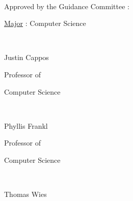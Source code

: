 \thispagestyle{plain}
\mbox{} \\
{\large
Approved by the Guidance Committee :

\vspace{.2 in}

\hspace{.2 in} \underline{Major} : Computer Science

\vspace{.2 in plus 1fill}

\hspace{3.2 in} \hrulefill\

\vspace{-.2 in}

\hspace{3.2 in} Justin Cappos
\vspace{-.1 in}

\hspace{3.2 in} Professor of

\vspace{-.2 in}

\hspace{3.2 in} Computer Science

\vspace{.2 in plus 1fill}




\hspace{3.2 in} \hrulefill\

\vspace{-.2 in}

\hspace{3.2 in} Phyllis Frankl
\vspace{-.1 in}

\hspace{3.2 in} Professor of

\vspace{-.2 in}

\hspace{3.2 in} Computer Science

\vspace{.2 in plus 1fill}

\hspace{3.2 in} \hrulefill\

\vspace{-.2 in}

\hspace{3.2 in} Thomas Wies
\vspace{-.1 in}

}
